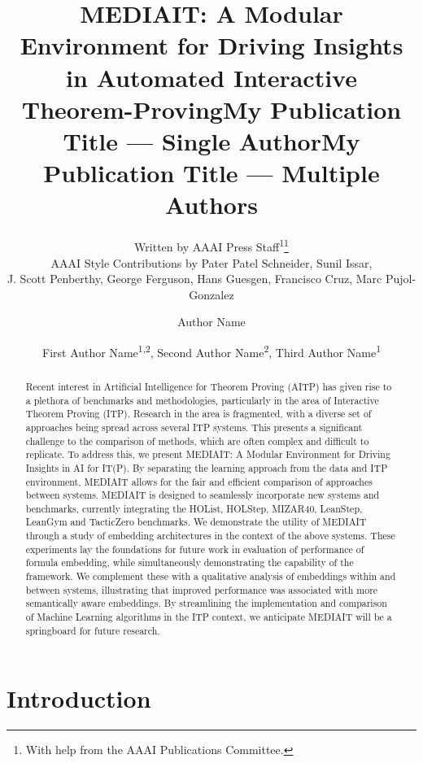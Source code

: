 \documentclass[letterpaper]{article} %
\title{MEDIAIT: A Modular Environment for Driving Insights in Automated Interactive Theorem-Proving}
\author{
    Written by AAAI Press Staff\textsuperscript{\rm 1}\thanks{With help from the AAAI Publications Committee.}\\
    AAAI Style Contributions by Pater Patel Schneider,
    Sunil Issar,\\
    J. Scott Penberthy,
    George Ferguson,
    Hans Guesgen,
    Francisco Cruz\equalcontrib,
    Marc Pujol-Gonzalez\equalcontrib
}
\title{My Publication Title --- Single Author}
\author {
    Author Name
}
\title{My Publication Title --- Multiple Authors}
\author {
    First Author Name\textsuperscript{\rm 1,\rm 2},
    Second Author Name\textsuperscript{\rm 2},
    Third Author Name\textsuperscript{\rm 1}
}
\begin{document}
    \maketitle

    \begin{abstract}
        Recent interest in Artificial Intelligence for Theorem Proving (AITP) has given rise to a plethora of benchmarks and
        methodologies, particularly in the area of Interactive Theorem Proving (ITP).
        Research in the area is fragmented, with a diverse set of approaches being spread across several ITP systems.
        This presents a significant challenge to the comparison of methods, which are often complex and difficult to replicate.
        To address this, we present MEDIAIT: A Modular Environment for Driving Insights in AI for IT(P).
        By separating the learning approach from the data and ITP environment, MEDIAIT allows for the fair and efficient
        comparison of approaches between systems.
        MEDIAIT is designed to seamlessly incorporate new systems and benchmarks, currently integrating the HOList, HOLStep,
        MIZAR40, LeanStep, LeanGym and TacticZero benchmarks.
        We demonstrate the utility of MEDIAIT through a study of embedding architectures in the context of the above systems.
        These experiments lay the foundations for future work in evaluation of performance of formula embedding,
        while simultaneously demonstrating the capability of the framework.
        We complement these with a qualitative analysis of embeddings within and between systems, illustrating that improved
        performance was associated with more semantically aware embeddings.
        By streamlining the implementation and comparison of Machine Learning algorithms in the ITP context,
        we anticipate MEDIAIT will be a springboard for future
        research.

    \end{abstract}


    \section{Introduction}
\end{document}
